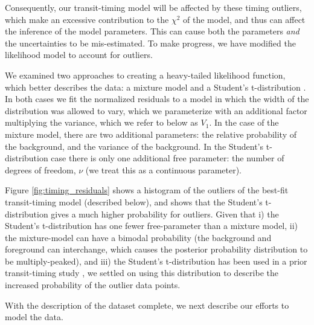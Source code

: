 \documentclass[twocolumn]{aastex63}
\begin{document}
Consequently, our transit-timing model will be affected by these
timing outliers, which make an excessive contribution to the
$\chi^2$ of the model, and thus can affect the inference of
the model parameters.   This can cause both the parameters {\it and}
the uncertainties to be mis-estimated.  To make progress, we have
modified the likelihood model to account for outliers.

We examined two approaches to creating a heavy-tailed likelihood function, which
better describes the data:  a mixture model \citep{Hogg2010,ForemanMackey2014} and
a Student's t-distribution \citep{JontofHutter2016}.   In both cases
we fit the normalized residuals to a model
in which the width of the distribution was
allowed to vary, which we parameterize with
an additional factor multiplying the variance, which we refer to below as $V_1$.  In the case of the mixture
model, there are two additional parameters:
the relative probability of the background, and
the variance of the background.  In the Student's t-distribution case there is only one 
additional free parameter:  the number of
degrees of freedom, $\nu$ (we treat this as a continuous parameter).

Figure \ref{fig:timing_residuals} shows a histogram of the outliers of the best-fit transit-timing model (described below), 
and shows that %
the Student's t-distribution gives a much higher probability
for outliers. %
Given that
i) the Student's t-distribution has one fewer free-parameter than a mixture model, ii)  the 
mixture-model can have a  bimodal probability (the background and foreground can interchange, 
which causes the posterior probability distribution to be multiply-peaked),
and iii)  the Student's t-distribution has been used in a prior transit-timing study \citep{JontofHutter2016},
we settled on using this distribution to describe the increased probability
of the outlier data points. 

With the description of the dataset complete, we next describe our efforts to model the data.



\end{document}
